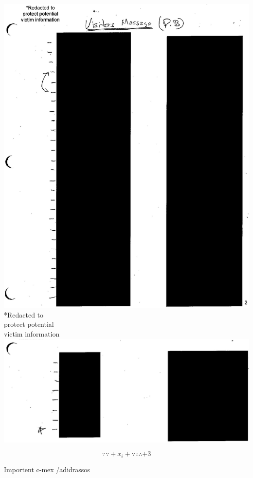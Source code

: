 \documentclass[10pt]{article}
\begin{document}
\includegraphics[max width=\textwidth, center]{2025_02_27_dd68c3d38de88f0516d9g-215}\\
*Redacted to\\
protect potential\\
victim information\\
\includegraphics[max width=\textwidth, center]{2025_02_27_dd68c3d38de88f0516d9g-216}

\[
\because \because+x_{i}+\because \therefore \therefore+3
\]

Importent c-mex /adidrassos
\end{document}

